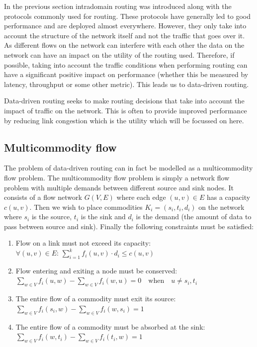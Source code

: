 In the previous section intradomain routing was introduced along with the protocols commonly used for routing. These protocols have generally led to good performance and are deployed almost everywhere. However, they only take into account the structure of the network itself and not the traffic that goes over it. As different flows on the network can interfere with each other the data on the network can have an impact on the utility of the routing used. Therefore, if possible, taking into account the traffic conditions when performing routing can have a significant positive impact on performance (whether this be measured by latency, throughput or some other metric). This leads us to data-driven routing.

Data-driven routing seeks to make routing decisions that take into account the impact of traffic on the network. This is often to provide improved performance by reducing link congestion which is the utility which will be focussed on here.

\subsection{Multicommodity flow}
\label{section:multicommodity}

The problem of data-driven routing can in fact be modelled as a multicommodity flow problem. The multicommodity flow problem is simply a network flow problem with multiple demands between different source and sink nodes. It consists of a flow network $G(V,E)$ where each edge $(u,v) \in E$ has a capacity $c(u,v)$. Then we wish to place commodities $K_i = (s_i, t_i, d_i)$ on the network where $s_i$ is the source, $t_i$ is the sink and $d_i$ is the demand (the amount of data to pass between source and sink). Finally the following constraints must be satisfied:

\begin{enumerate}
    \item Flow on a link must not exceed its capacity:\\
    $\forall (u,v)\in E:\,\sum_{i=1}^{k} f_i(u,v)\cdot d_i \leq c(u,v)$
    \item Flow entering and exiting a node must be conserved:\\
    $\sum_{w \in V} f_i(u,w) - \sum_{w \in V} f_i(w,u) = 0 \quad \mathrm{when} \quad u \neq s_i, t_i$
    \item The entire flow of a commodity must exit its source:\\
    $\sum_{w \in V} f_i(s_i,w) - \sum_{w \in V} f_i(w,s_i) = 1$
    \item The entire flow of a commodity must be absorbed at the sink:\\
    $\sum_{w \in V} f_i(w,t_i) - \sum_{w \in V} f_i(t_i,w) = 1$
\end{enumerate}

